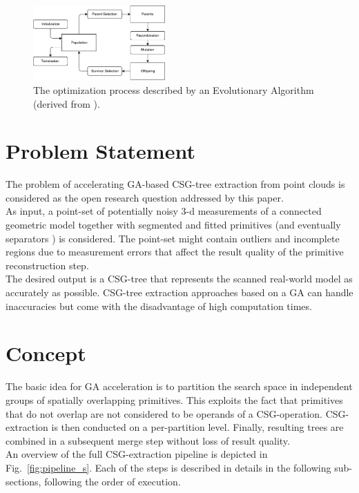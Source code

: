 \begin{figure}[htb]
	\centering
	\includegraphics[width=0.45\textwidth]{figures/evo.pdf}
	\caption{The optimization process described by an Evolutionary Algorithm (derived from \cite{eiben2003introduction}).}
	\label{fig:evo}
\end{figure}

\section{Problem Statement}
\label{sec:prob}
The problem of accelerating \ac{GA}-based \ac{CSG}-tree extraction from point clouds is considered as the open research question addressed by this paper.
\\
As input, a point-set of potentially noisy $3$-d measurements of a connected geometric model together with segmented and fitted primitives 
(and eventually separators \cite{shapiro1993separation}) 
is considered. 
The point-set might contain outliers and incomplete regions due to measurement errors that affect the result quality of the primitive reconstruction step.
\\
The desired output is a \ac{CSG}-tree that represents the scanned real-world model as accurately as possible.
\ac{CSG}-tree extraction approaches based on a \ac{GA} \cite{fayolle2016evolutionary} can handle 
inaccuracies but come with the disadvantage of high computation times.

\section{Concept}
\label{sec:concept}
The basic idea for \ac{GA} acceleration is to partition the search space in independent groups of spatially overlapping primitives.
This exploits the fact that primitives that do not overlap are not considered to be operands of a \ac{CSG}-operation.
\ac{CSG}-extraction is then conducted on a per-partition level. 
Finally, resulting trees are combined in a subsequent merge step without loss of result quality. 
\\
An overview of the full \ac{CSG}-extraction pipeline is depicted in Fig.~\ref{fig:pipeline_s}. 
Each of the steps is described in details in the following sub-sections, following the order of execution.

